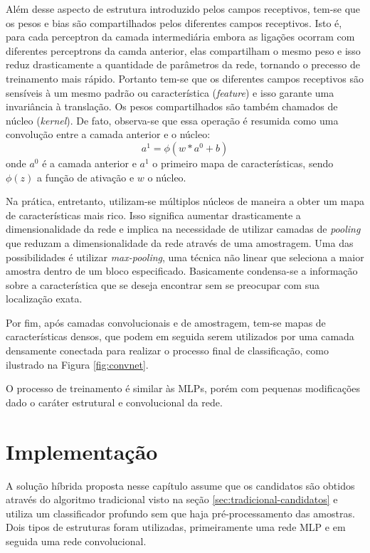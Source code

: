 Além desse aspecto de estrutura introduzido pelos campos receptivos, tem-se que os pesos e bias são compartilhados pelos diferentes campos receptivos. Isto é, para cada perceptron da camada intermediária embora as ligações ocorram com diferentes perceptrons da camda anterior, elas compartilham o mesmo peso e isso reduz drasticamente a quantidade de parâmetros da rede, tornando o precesso de treinamento mais rápido. Portanto tem-se que os diferentes campos receptivos são sensíveis à um mesmo padrão ou característica (\textit{feature}) e isso garante uma invariância à translação. Os pesos compartilhados são também chamados de núcleo (\textit{kernel}). De fato, observa-se que essa operação é resumida como uma convolução entre a camada anterior e o núcleo:
\begin{equation}
a^1 = \phi(w \ast a^0 + b) 
\end{equation}
onde $a^0$ é a camada anterior e $a^1$ o primeiro mapa de características, sendo $\phi(z)$ a função de ativação e $w$ o núcleo.

Na prática, entretanto, utilizam-se múltiplos núcleos de maneira a obter um mapa de características mais rico. Isso significa aumentar drasticamente a dimensionalidade da rede e implica na necessidade de utilizar camadas de \textit{pooling} que reduzam a dimensionalidade da rede através de uma amostragem. Uma das possibilidades é utilizar \textit{max-pooling}, uma técnica não linear que seleciona a maior amostra dentro de um bloco especificado. Basicamente condensa-se a informação sobre a característica que se deseja encontrar sem se preocupar com sua localização exata.

Por fim, após camadas convolucionais e de amostragem, tem-se mapas de características densos, que podem em seguida serem utilizados por uma camada densamente conectada para realizar o processo final de classificação, como ilustrado na Figura \ref{fig:convnet}. 

O processo de treinamento é similar às MLPs, porém com pequenas modificações dado o caráter estrutural e convolucional da rede.

\section{Implementação}
A solução híbrida proposta nesse capítulo assume que os candidatos são obtidos através do algoritmo tradicional visto na seção \ref{sec:tradicional-candidatos} e utiliza um classificador profundo sem que haja pré-processamento das amostras. Dois tipos de estruturas foram utilizadas, primeiramente uma rede MLP e em seguida uma rede convolucional. 

